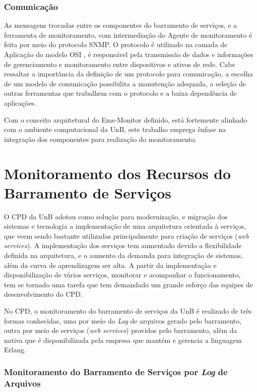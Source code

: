 \subsubsection{Comunicação}

As mensagens trocadas entre os componentes do barramento de serviços, e a ferramenta de monitoramento, com intermediação do Agente de monitoramento é feita por meio do protocolo \acrshort{SNMP}. O protocolo é utilizado na camada de Aplicação do modelo OSI \cite{tanenbaum2003redes}, é responsável pela transmissão de dados e informações de gerenciamento e monitoramento entre dispositivos e ativos de rede. Cabe ressaltar a importância da definição de um protocolo para comunicação, a escolha de um modelo de comunicação possibilita a manutenção adequada, a seleção de outras ferramentas que trabalhem com o protocolo e a baixa dependência de aplicações.     

Com o conceito arquitetural do Ems-Monitor definido, está fortemente alinhado com o ambiente computacional da \acrshort{UnB}, este trabalho emprega ênfase na integração dos componentes para realização do monitoramento.   

\section{Monitoramento dos Recursos do Barramento de Serviços}%
\label{recursos_monitoramento}

O \acrshort{CPD} da \acrshort{UnB} adotou como solução para modernização, e migração dos sistemas e tecnologia a implementação de uma arquitetura orientada à serviços, que veem sendo bastante utilizadas principalmente para criação de serviços (\textit{web services}). A implementação dos serviços tem aumentado devido a flexibilidade definida na arquitetura, e o aumento da demanda para integração de sistemas, além da curva de aprendizagem ser alta. A partir da implementação e disponibilização de  vários serviços, monitorar e acompanhar o funcionamento, tem se tornado uma tarefa que tem demandado um grande esforço das equipes de desenvolvimento do \acrshort{CPD}. 

No \acrshort{CPD}, o monitoramento do barramento de serviços da \acrshort{UnB} é realizado de três formas conhecidas, uma por meio do \textit{Log} de arquivos gerado pelo barramento, outra por meio de serviços (\textit{web services}) providos pelo barramento, além da nativa que é disponibilizada pela empresa que mantém e gerencia a linguagem Erlang.

\subsubsection{Monitoramento do Barramento de Serviços por \textit{Log} de Arquivos}

